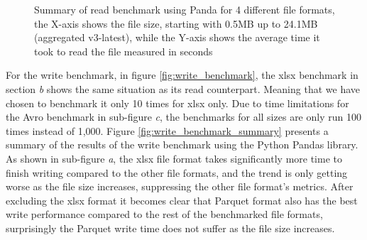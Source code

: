 \begin{figure}[H]%
    \centering
    \qquad
    \caption{Summary of read benchmark using Panda for 4 different file formats, the X-axis shows the file size, starting with 0.5MB up to 24.1MB (aggregated v3-latest), while the Y-axis shows the average time it took to read the file measured in seconds}%
    \label{fig:read_benchmarks_summary}%
\end{figure}

For the write benchmark, in figure \ref{fig:write_benchmark}, the xlsx benchmark in section \textit{b} shows the same situation as its read counterpart. Meaning that we have chosen to benchmark it only 10 times for xlsx only. Due to time limitations for the Avro benchmark in sub-figure \textit{c}, the benchmarks for all sizes are only run 100 times instead of 1,000. Figure \ref{fig:write_benchmark_summary} presents a summary of the results of the write benchmark using the Python Pandas library. As shown in sub-figure \textit{a}, the xlsx file format takes significantly more time to finish writing compared to the other file formats, and the trend is only getting worse as the file size increases, suppressing the other file format's metrics. After excluding the xlsx format it becomes clear that Parquet format also has the best write performance compared to the rest of the benchmarked file formats, surprisingly the Parquet write time does not suffer as the file size increases.

